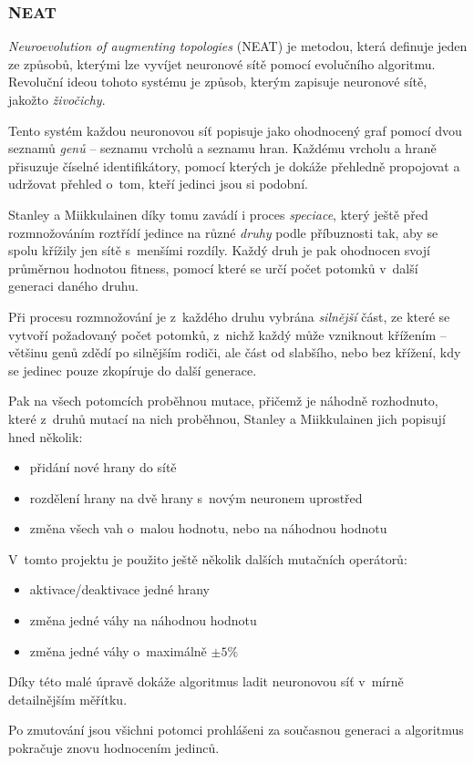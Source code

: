 \documentclass[a4]{article}
\begin{document}
\subsubsection{NEAT}
\emph{Neuroevolution of augmenting topologies}\cite{neat} (NEAT) je metodou, která definuje jeden ze způsobů, kterými lze vyvíjet neuronové sítě pomocí evolučního algoritmu. Revoluční ideou tohoto systému je způsob, kterým zapisuje neuronové sítě, jakožto \emph{živočichy}.\par
Tento systém každou neuronovou síť popisuje jako ohodnocený graf pomocí dvou seznamů \emph{genů} -- seznamu vrcholů a seznamu hran. Každému vrcholu a hraně přisuzuje číselné identifikátory, pomocí kterých je dokáže přehledně propojovat a udržovat přehled o~tom, kteří jedinci jsou si  podobní.\par
Stanley a Miikkulainen díky tomu zavádí i proces \emph{speciace}, který ještě před rozmnožováním roztřídí jedince na různé \emph{druhy} podle příbuznosti tak, aby se spolu křížily jen sítě s~menšími rozdíly. Každý druh je pak ohodnocen svojí průměrnou hodnotou fitness, pomocí které se určí počet potomků v~další generaci daného druhu.\par
Při procesu rozmnožování je z~každého druhu vybrána \emph{silnější} část, ze které se vytvoří požadovaný počet potomků, z~nichž každý může vzniknout křížením -- většinu genů zdědí po silnějším rodiči, ale část od slabšího, nebo bez křížení, kdy se jedinec pouze zkopíruje do další generace.\par
Pak na všech potomcích proběhnou mutace, přičemž je náhodně rozhodnuto, které z~druhů mutací na nich proběhnou, Stanley a Miikkulainen jich popisují hned několik:
\begin{itemize}
\item{přidání nové hrany do sítě}
\item{rozdělení hrany na dvě hrany s~novým neuronem uprostřed}
\item{změna všech vah o~malou hodnotu, nebo na náhodnou hodnotu}
\end{itemize}
V~tomto projektu je použito ještě několik dalších mutačních operátorů:
\begin{itemize}
\item{aktivace/deaktivace jedné hrany}
\item{změna jedné váhy na náhodnou hodnotu}
\item{změna jedné váhy o~maximálně $\pm 5\%$}
\end{itemize}
Díky této malé úpravě dokáže algoritmus ladit neuronovou síť v~mírně detailnějším měřítku.\par
Po zmutování jsou všichni potomci prohlášeni za současnou generaci a algoritmus pokračuje znovu hodnocením jedinců.
\end{document}
